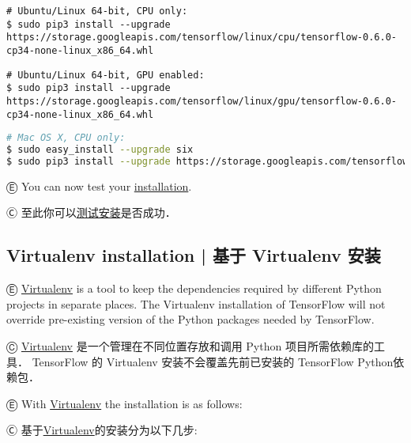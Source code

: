 \begin{lstlisting}
# Ubuntu/Linux 64-bit, CPU only:
$ sudo pip3 install --upgrade https://storage.googleapis.com/tensorflow/linux/cpu/tensorflow-0.6.0-cp34-none-linux_x86_64.whl
\end{lstlisting}

\begin{lstlisting}
# Ubuntu/Linux 64-bit, GPU enabled:
$ sudo pip3 install --upgrade https://storage.googleapis.com/tensorflow/linux/gpu/tensorflow-0.6.0-cp34-none-linux_x86_64.whl

\end{lstlisting}

\begin{lstlisting}[language = bash]
# Mac OS X, CPU only:
$ sudo easy_install --upgrade six
$ sudo pip3 install --upgrade https://storage.googleapis.com/tensorflow/mac/tensorflow-0.6.0-py3-none-any.whl
\end{lstlisting}

Ⓔ \textcolor{etc}{You can now test your \hyperref[test_install]{installation}.}

Ⓒ 至此你可以\hyperref[test_install]{测试安装}是否成功．


%
\subsection {Virtualenv installation  |  基于 Virtualenv 安装} \label{virtualenv_install}

Ⓔ \textcolor{etc}{\href{http://docs.python-guide.org/en/latest/dev/virtualenvs/}{Virtualenv} is a tool to keep the dependencies required by different Python projects in separate places. The Virtualenv installation of TensorFlow will not override pre-existing version of the Python packages needed by TensorFlow.}

Ⓒ \href{http://docs.python-guide.org/en/latest/dev/virtualenvs/}{Virtualenv} 是一个管理在不同位置存放和调用 Python 项目所需依赖库的工具． TensorFlow 的 Virtualenv 安装不会覆盖先前已安装的 TensorFlow Python依赖包．

Ⓔ \textcolor{etc}{With \href{https://pypi.python.org/pypi/virtualenv}{Virtualenv} the installation is as follows:}

Ⓒ 基于\href{https://pypi.python.org/pypi/virtualenv}{Virtualenv}的安装分为以下几步:

